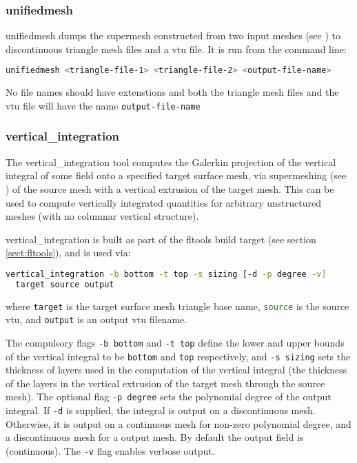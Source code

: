 
\subsubsection{unifiedmesh}
\label{sect:unifiedmesh}
unifiedmesh dumps the supermesh constructed from two input meshes (see \citet{farrell2009a,farrell2010a}) to discontinuous triangle mesh files and a vtu file. It is run from the command line:
\begin{lstlisting}[language = Bash]
unifiedmesh <triangle-file-1> <triangle-file-2> <output-file-name>
\end{lstlisting} 
No file names should have extenstions and both the triangle mesh files and the vtu file will have the name \lstinline[language = Bash]+output-file-name+


\subsubsection{vertical\_integration}
\label{sect:vertical_integration}

The vertical\_integration tool computes the Galerkin projection of the vertical
integral of some field onto a specified target surface mesh, via supermeshing (see \citet{farrell2009a,farrell2010a})
of the source mesh with a vertical extrusion of the target mesh. This can be used to
compute vertically integrated quantities for arbitrary unstructured meshes (with
no columnar vertical structure).

vertical\_integration is built as part of the fltools build target (see section \ref{sect:fltools}),
and is used via:

\begin{lstlisting}[language = Bash]
vertical_integration -b bottom -t top -s sizing [-d -p degree -v]
  target source output
\end{lstlisting}

where \lstinline[language = Bash]+target+ is the target surface mesh triangle base name,
\lstinline[language = Bash]+source+ is the source vtu, and \lstinline[language = Bash]+output+
is an output vtu filename.

The compulsory flags \lstinline[language = Bash]+-b bottom+
and \lstinline[language = Bash]+-t top+ define the lower and upper bounds of
the vertical integral to be \lstinline[language = Bash]+bottom+ and \lstinline[language = Bash]+top+
respectively, and \lstinline[language = Bash]+-s sizing+ sets the thickness of layers
used in the computation of the vertical integral (the thickness of the layers in the
vertical extrusion of the target mesh through the source mesh). The optional
flag \lstinline[language = Bash]+-p degree+ sets the polynomial degree of the
output integral. If \lstinline[language = Bash]+-d+ is supplied, the integral
is output on a discontinuous mesh. Otherwise, it is output on a continuous
mesh for non-zero polynomial degree, and a discontinuous mesh for a \Pzero
output mesh. By default the output field is \Pone (continuous).
The \lstinline[language = Bash]+-v+ flag enables verbose output.

